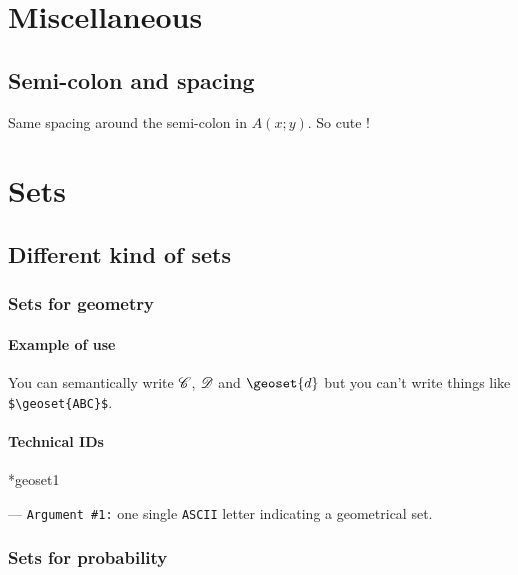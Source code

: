 \documentclass[12pt,a4paper]{article}
\makeatletter
\newcommand\ascii{\texttt{ASCII}}
\newcommand\IDmacro{\@ifstar{\@IDmacroStar}{\@IDmacroNoStar}}
\newcommand\@IDmacroNoStar[3]{%
        \texttt{%
        	\textbackslash#1%
        	\IfStrEq{#2}{0}{}{%
        		\,\,[#2 Option%
				\IfStrEq{#2}{1}{}{s}]%
			}%
    	    \,\,(#3 Argument%
				\IfStrEq{#3}{1}{}{s})%
	   	}
        \immediate\write\tempfile{macro@#1@#2@#3}%
    }
\newcommand\@IDmacroStar[2]{%
        \@IDmacroNoStar{#1}{0}{#2}%
    }
\newcommand\@IDoptarg[2]{%
    	\vspace{0.5em}
		--- \texttt{#1 \##2:}%
	}
\newcommand\IDarg[1]{%
    	\@IDoptarg{Argument}{#1}%
	}
\makeatother
\begin{document}
\section{Miscellaneous}



\subsection{Semi-colon and spacing}

\begin{tcblisting}{}
Same spacing around the semi-colon in $A(x;y)$. So cute !
\end{tcblisting}


\section{Sets}



\subsection{Different kind of sets}

    \subsubsection{Sets for geometry}

		\paragraph{Example of use}

\begin{tcblisting}{}
You can semantically write $\geoset{C}$, $\geoset{D}$ and $\geoset{d}$
but you can't write things like \verb+$\geoset{ABC}$+.
\end{tcblisting}


		\paragraph{Technical IDs}

\IDmacro*{geoset}{1}

\IDarg{1} one single \ascii{} letter indicating a geometrical set.



    \subsubsection{Sets for probability}
\end{document}
